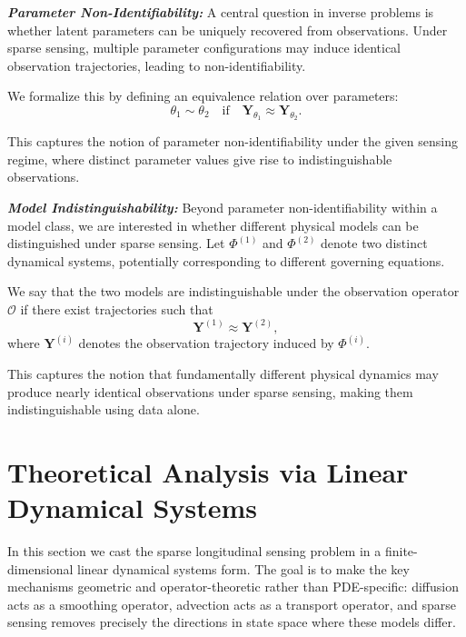 \textit{\textbf{Parameter Non-Identifiability:}} A central question in inverse problems is whether latent parameters can be uniquely recovered from observations. Under sparse sensing, multiple parameter configurations may induce identical observation trajectories, leading to non-identifiability.

We formalize this by defining an equivalence relation over parameters:
\begin{equation}
\theta_1 \sim \theta_2 \quad \text{if} \quad \mathbf{Y}_{\theta_1} \approx \mathbf{Y}_{\theta_2}.
\end{equation}

This captures the notion of parameter non-identifiability under the given sensing regime, where distinct parameter values give rise to indistinguishable observations.

\textit{\textbf{Model Indistinguishability:}} Beyond parameter non-identifiability within a model class, we are interested in whether different physical models can be distinguished under sparse sensing. Let $\Phi^{(1)}$ and $\Phi^{(2)}$ denote two distinct dynamical systems, potentially corresponding to different governing equations.

We say that the two models are indistinguishable under the observation operator $\mathcal{O}$ if there exist trajectories such that
\begin{equation}
\mathbf{Y}^{(1)} \approx \mathbf{Y}^{(2)},
\end{equation}
where $\mathbf{Y}^{(i)}$ denotes the observation trajectory induced by $\Phi^{(i)}$.

This captures the notion that fundamentally different physical dynamics may produce nearly identical observations under sparse sensing, making them indistinguishable using data alone.







\section{Theoretical Analysis via Linear Dynamical Systems}
\label{sec:theory}

In this section we cast the sparse longitudinal sensing problem in a finite-dimensional linear dynamical systems form. The goal is to make the key mechanisms geometric and operator-theoretic rather than PDE-specific: diffusion acts as a smoothing operator, advection acts as a transport operator, and sparse sensing removes precisely the directions in state space where these models differ.

